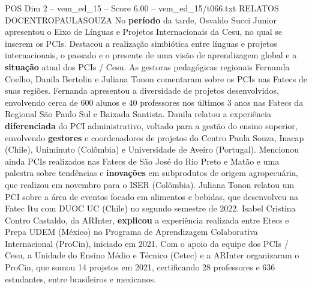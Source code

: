 \begin{textsample}{POS Dim 2 – vem\_ed\_15 – Score 6.00 – vem\_ed\_15/t066.txt}  \label{ex:f2_pos_162}
RELATOS DOCENTROPAULASOUZA No \textbf{período} da tarde, Osvaldo Succi Junior apresentou o Eixo de Línguas e Projetos Internacionais da Cesu, no qual se inserem os PCIs.
Destacou a realização simbiótica entre línguas e projetos internacionais, o passado e o presente de uma visão de aprendizagem global e a \textbf{situação} atual dos PCIs / Cesu.
As gestoras pedagógicas regionais Fernanda Coelho, Danila Bertolin e Juliana Tonon comentaram sobre os PCIs nas Fatecs de suas regiões.
Fernanda apresentou a diversidade de projetos desenvolvidos, envolvendo cerca de 600 alunos e 40 professores nos últimos 3 anos nas Fatecs da Regional São Paulo Sul e Baixada Santista.
Danila relatou a experiência \textbf{diferenciada} do PCI administrativo, voltado para a gestão do ensino superior, envolvendo \textbf{gestores} e coordenadores de projetos do Centro Paula Souza, Inacap (Chile), Uniminuto (Colômbia) e Universidade de Aveiro (Portugal).
Mencionou ainda PCIs realizados nas Fatecs de São José do Rio Preto e Matão e uma palestra sobre tendências e \textbf{inovações} em subprodutos de origem agropecuária, que realizou em novembro para o ISER (Colômbia).
Juliana Tonon relatou um PCI sobre a área de eventos focado em alimentos e bebidas, que desenvolveu na Fatec Itu com DUOC UC (Chile) no segundo semestre de 2022.
Isabel Cristina Contro Castaldo, da ARInter, \textbf{explicou} a experiência realizada entre Etecs e Prepa UDEM (México) no Programa de Aprendizagem Colaborativa Internacional (ProCin), iniciado em 2021.
Com o apoio da equipe dos PCIs / Cesu, a Unidade do Ensino Médio e Técnico (Cetec) e a ARInter organizaram o ProCin, que somou 14 projetos em 2021, certificando 28 professores e 636 estudantes, entre brasileiros e mexicanos.

\end{textsample}
